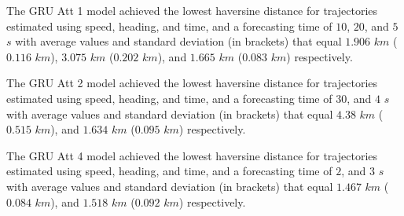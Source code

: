 \begin{table}[!ht]
	\centering
	\caption{The average haversine distance in $km$, with standard deviation in brackets, across $k$-fold validation datasets for the trajectories in the $k$-fold testing datasets estimated using speed, heading, and time, different RNN models, and forecasting times.}
	\label{tab:best_speed_actual_dir_haversine}
\end{table}

The GRU Att 1 model achieved the lowest haversine distance for trajectories estimated using speed, heading, and time, and a forecasting time of $10$, $20$, and $5$ $s$ with average values and standard deviation (in brackets) that equal $1.906$ $km$ ($0.116$ $km$), $3.075$ $km$ ($0.202$ $km$), and $1.665$ $km$ ($0.083$ $km$) respectively.

The GRU Att 2 model achieved the lowest haversine distance for trajectories estimated using speed, heading, and time, and a forecasting time of $30$, and $4$ $s$ with average values and standard deviation (in brackets) that equal $4.38$ $km$ ($0.515$ $km$), and $1.634$ $km$ ($0.095$ $km$) respectively.

The GRU Att 4 model achieved the lowest haversine distance for trajectories estimated using speed, heading, and time, and a forecasting time of $2$, and $3$ $s$ with average values and standard deviation (in brackets) that equal $1.467$ $km$ ($0.084$ $km$), and $1.518$ $km$ ($0.092$ $km$) respectively.

